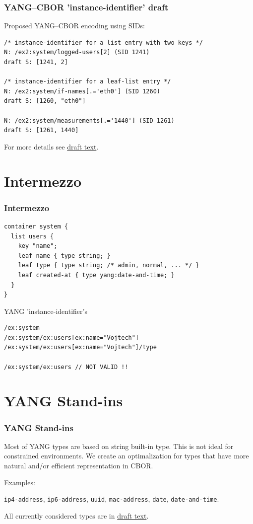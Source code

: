 \documentclass{beamer}
\begin{document}
\begin{frame}[fragile]
	\frametitle{YANG--CBOR 'instance-identifier' draft}
Proposed YANG--CBOR encoding using SIDs:

\begin{verbatim}
/* instance-identifier for a list entry with two keys */
N: /ex2:system/logged-users[2] (SID 1241)
draft S: [1241, 2]

/* instance-identifier for a leaf-list entry */
N: /ex2:system/if-names[.='eth0'] (SID 1260)
draft S: [1260, "eth0"]

N: /ex2:system/measurements[.='1440'] (SID 1261)
draft S: [1261, 1440]
\end{verbatim}

For more details see \href{https://datatracker.ietf.org/doc/draft-vilimek-yang-cbor-inst-id/}{draft text}.
\end{frame}

\section{Intermezzo}
\begin{frame}[fragile]
	\frametitle{Intermezzo}
\begin{verbatim}
container system {
  list users {
    key "name";
    leaf name { type string; }
    leaf type { type string; /* admin, normal, ... */ }
    leaf created-at { type yang:date-and-time; }
  }
}
\end{verbatim}
YANG 'instance-identifier's
\begin{verbatim}
/ex:system
/ex:system/ex:users[ex:name="Vojtech"]
/ex:system/ex:users[ex:name="Vojtech"]/type

/ex:system/ex:users // NOT VALID !!
\end{verbatim}
\end{frame}

\section{YANG Stand-ins}
\begin{frame}[fragile]
	\frametitle{YANG Stand-ins}
	
	Most of YANG types are based on string built-in type.
	This is not ideal for constrained environments.
	We create an optimalization for types that have more natural and/or efficient 
	representation in CBOR.
	
	Examples:
	
	\verb|ip4-address|, \verb|ip6-address|, \verb|uuid|, \verb|mac-address|, \verb|date|, \verb|date-and-time|.

	All currently considered types are in \href{https://datatracker.ietf.org/doc/draft-bormann-cbor-yang-standin/}{draft text}.

\end{frame}
\end{document}
